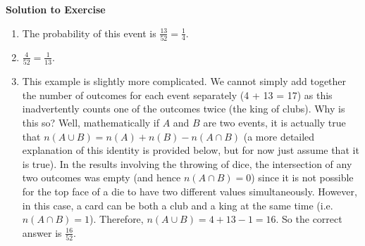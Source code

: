 {\begin{mdframed}[linewidth=4, leftmargin=40, rightmargin=40]
\begin{exercise}
        
        \vspace{5pt}
        \label{m39377*solfhsst!!!underscore!!!id333}\noindent\textbf{Solution to Exercise } \label{m39377*listfhsst!!!underscore!!!id333}\begin{enumerate}[noitemsep, label=\textbf{Step} \textbf{\arabic*}. ] 
            \leftskip=20pt\rightskip=\leftskip\item  
        \label{m39377*id112177}The probability of this event is \begin{math}\frac{13}{52}=\frac{1}{4}\end{math}.\par 
        \item  
        \label{m39377*id112208}\begin{math}\frac{4}{52}=\frac{1}{13}\end{math}.\par 
        \item  
        \label{m39377*id112236}This example is slightly more complicated. We cannot
simply add together the number of outcomes for each event separately
(4 + 13 = 17) as this inadvertently counts one of the outcomes twice (the king
of clubs). Why is this so? Well, mathematically if \begin{math}A\end{math} and \begin{math}B\end{math} are two events, it is actually true that 
\begin{math}n\left(A\cup B\right)=n\left(A\right)+n\left(B\right)-n\left(A\cap B\right)\end{math} (a more detailed explanation of this identity is provided below, but for now just assume that it is true). In the results involving the
throwing of dice, the intersection of any two outcomes was empty (and hence
\begin{math}n\left(A\cap B\right)=0\end{math})
since it is not possible for the top face of a die to have two different values
simultaneously. However, in this case, a card can be both a club and a king at
the same time (i.e. \begin{math}n\left(A\cap B\right)=1\end{math}).
Therefore, \begin{math}n\left(A\cup B\right)=4+13-1=16\end{math}. So the correct answer is \begin{math}\frac{16}{52}\end{math}.
 \par 
        \end{enumerate}
         

    \end{exercise}
    \end{mdframed}
    }
    \noindent
  
